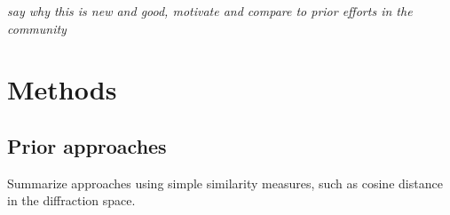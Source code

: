 \documentclass[12pt]{iopart}
\begin{document}
\emph{say why this is new and good, motivate and compare to prior efforts in the community}


%
%
%
%
%


\section{Methods}

\subsection{Prior approaches}
Summarize approaches using simple similarity measures, such as cosine distance in the diffraction space.
\end{document}
